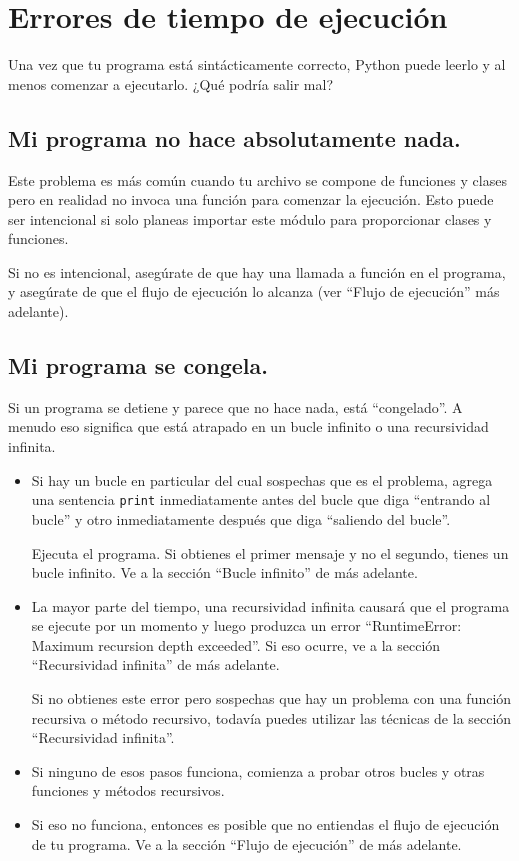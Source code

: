 \documentclass[10pt]{book}
\begin{document}
\section{Errores de tiempo de ejecución}

Una vez que tu programa está sintácticamente correcto,
Python puede leerlo y al menos comenzar a ejecutarlo.  ¿Qué podría
salir mal?


\subsection{Mi programa no hace absolutamente nada.}

Este problema es más común cuando tu archivo se compone de funciones y
clases pero en realidad no invoca una función para comenzar la ejecución.
Esto puede ser intencional si solo planeas importar este módulo para
proporcionar clases y funciones.

Si no es intencional, asegúrate de que hay una llamada a función
en el programa, y asegúrate de que el flujo de ejecución
lo alcanza (ver ``Flujo de ejecución'' más adelante).


\subsection{Mi programa se congela.}

Si un programa se detiene y parece que no hace nada, está ``congelado''.
A menudo eso significa que está atrapado en un bucle infinito o una
recursividad infinita.

\begin{itemize}

\item Si hay un bucle en particular del cual sospechas que es el
problema, agrega una sentencia {\tt print} inmediatamente antes del bucle que
diga ``entrando al bucle'' y otro inmediatamente después que diga
``saliendo del bucle''.

Ejecuta el programa.  Si obtienes el primer mensaje y no el segundo,
tienes un bucle infinito.  Ve a la sección ``Bucle infinito''
de más adelante.

\item La mayor parte del tiempo, una recursividad infinita causará que el
programa se ejecute por un momento y luego produzca un error ``RuntimeError: Maximum
recursion depth exceeded''.  Si eso ocurre, ve a la sección
``Recursividad infinita'' de más adelante.

Si no obtienes este error pero sospechas que hay un problema
con una función recursiva o método recursivo, todavía puedes utilizar las técnicas
de la sección ``Recursividad infinita''.

\item Si ninguno de esos pasos funciona, comienza a probar otros
bucles y otras funciones y métodos recursivos.

\item Si eso no funciona, entonces es posible que
no entiendas el flujo de ejecución de tu programa.
Ve a la sección ``Flujo de ejecución'' de más adelante.

\end{itemize}
\end{document}
